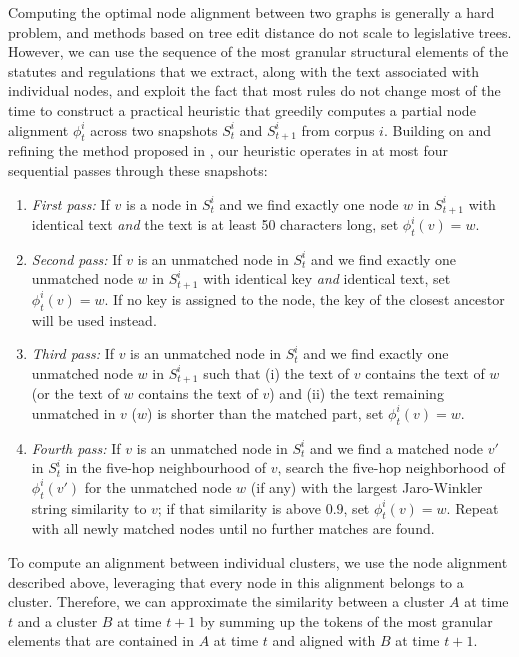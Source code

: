 \documentclass[utf8,sort&compress,numbers,square,table,hidelinks]{frontiers_suppmat} %
\begin{document}
Computing the optimal node alignment between two graphs is generally a hard problem,
and methods based on tree edit distance do not scale to legislative trees.
However, we can use the sequence of the most granular structural elements of the statutes and regulations that we extract,
along with the text associated with individual nodes,
and exploit the fact that most rules do not change most of the time
to construct a practical heuristic that greedily computes a partial node alignment $\phi^i_t$ across two snapshots $S^i_t$ and $S^i_{t+1}$ from corpus $i$.
Building on and refining the method proposed in \cite{katz2020}, 
our heuristic operates in at most four sequential passes through these snapshots:
\begin{enumerate}
	\item \emph{First pass:}
	If $v$ is a node in $S^i_t$ and we find exactly one node $w$ in $S^i_{t+1}$ with identical text \emph{and} the text is at least 50 characters long, set $\phi^i_t(v) = w$.
	\item \emph{Second pass:}
	If $v$ is an unmatched node in $S^i_t$ and we find exactly one unmatched node $w$ in $S^i_{t+1}$ with identical key \emph{and} identical text,
	set $\phi^i_t(v) = w$.
	If no key is assigned to the node, the key of the closest ancestor will be used instead.
	\item \emph{Third pass:}
	If $v$ is an unmatched node in $S^i_t$ and we find exactly one unmatched node $w$ in $S^i_{t+1}$ such that (i) the text of $v$ contains the text of $w$ (or the text of $w$ contains the text of $v$) and (ii) the text remaining unmatched in $v$ ($w$) is shorter than the matched part, set $\phi^i_t(v) = w$.
	\item \emph{Fourth pass:}
	If $v$ is an unmatched node in $S^i_t$ and we find a matched node $v'$ in $S^i_t$ in the five-hop neighbourhood of $v$,
	search the five-hop neighborhood of $\phi^i_t(v')$ for the unmatched node $w$ (if any) with the largest Jaro-Winkler string similarity \cite{winkler1990} to $v$;
	if that similarity is above $0.9$, set $\phi^i_t(v) = w$.
	Repeat with all newly matched nodes until no further matches are found.
\end{enumerate}
To compute an alignment between individual clusters, 
we use the node alignment described above, 
leveraging that every node in this alignment belongs to a cluster. 
Therefore, we can approximate the similarity between a cluster $A$ at time $t$ and a cluster $B$ at time $t+1$ by summing up the tokens of the most granular elements that are contained in $A$ at time $t$ and aligned with $B$ at time $t+1$.
\end{document}
